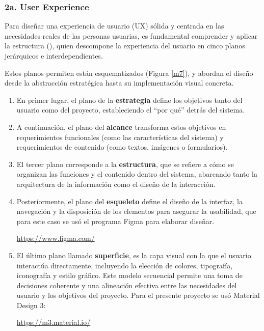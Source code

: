 \subsubsection{2a. User Experience}

Para diseñar una experiencia de usuario (UX) sólida y centrada en las necesidades reales de las personas usuarias, es fundamental comprender y aplicar la estructura (\cite{garrett2011elements}), quien descompone la experiencia del usuario en cinco planos jerárquicos e interdependientes. 

Estos planos permiten están esquematizados (Figura \ref{m7}), y abordan el diseño desde la abstracción estratégica hasta su implementación visual concreta. 

\begin{enumerate}
  \item En primer lugar, el plano de la \textbf{estrategia} define los objetivos tanto del usuario como del proyecto, estableciendo el ``por qué'' detrás del sistema. 
  
   \item A continuación, el plano del \textbf{alcance} transforma estos objetivos en requerimientos funcionales (como las características del sistema) y requerimientos de contenido (como textos, imágenes o formularios).

 \item El tercer plano corresponde a la \textbf{estructura}, que se refiere a cómo se organizan las funciones y el contenido dentro del sistema, abarcando tanto la arquitectura de la información como el diseño de la interacción. 
 
  \item Posteriormente, el plano del \textbf{esqueleto} define el diseño de la interfaz, la navegación y la disposición de los elementos para asegurar la usabilidad, que para este caso se usó el programa Figma para elaborar diseñar. 
  \begin{center}
    \url{https://www.figma.com/}
  \end{center}
  
   \item El último plano llamado \textbf{superficie}, es la capa visual con la que el usuario interactúa directamente, incluyendo la elección de colores, tipografía, iconografía y estilo gráfico. Este modelo secuencial permite una toma de decisiones coherente y una alineación efectiva entre las necesidades del usuario y los objetivos del proyecto. Para el presente proyecto se usó Material Design 3:
   \begin{center}
    \url{https://m3.material.io/}
   \end{center}
\end{enumerate}


